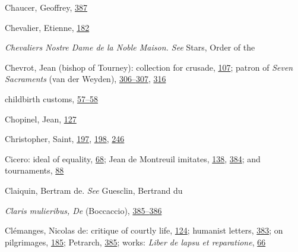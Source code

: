 Chaucer, Geoffrey,
\protect\hyperlink{22_Chapter_Fourteen__THE_COMING_OF.xhtmlux5cux23page_387}{387}

Chevalier, Etienne,
\protect\hyperlink{13_Chapter_Six__THE_DEPICTION_OF_TH.xhtmlux5cux23page_182}{182}

\emph{Chevaliers Nostre Dame de la Noble Maison. See} Stars, Order of
the

Chevrot, Jean (bishop of Tourney): collection for crusade,
\protect\hyperlink{10_Chapter_Three__THE_HEROIC_DREAM.xhtmlux5cux23page_107}{107};
patron of \emph{Seven Sacraments} (van der Weyden),
\protect\hyperlink{20_ILLUSTRATIONS_FOLLOW_PAGE.xhtmlux5cux23page_306}{306--}\protect\hyperlink{20_ILLUSTRATIONS_FOLLOW_PAGE.xhtmlux5cux23page_307}{307},
\protect\hyperlink{20_ILLUSTRATIONS_FOLLOW_PAGE.xhtmlux5cux23page_316}{316}

childbirth customs,
\protect\hyperlink{09_Chapter_Two__THE_CRAVING_FOR_A_M.xhtmlux5cux23page_57}{57--}\protect\hyperlink{09_Chapter_Two__THE_CRAVING_FOR_A_M.xhtmlux5cux23page_58}{58}

Chopinel, Jean,
\protect\hyperlink{11_Chapter_Four__THE_FORMS_OF_LOVE.xhtmlux5cux23page_127}{127}

Christopher, Saint,
\protect\hyperlink{13_Chapter_Six__THE_DEPICTION_OF_TH.xhtmlux5cux23page_197}{197},
\protect\hyperlink{13_Chapter_Six__THE_DEPICTION_OF_TH.xhtmlux5cux23page_198}{198},
\protect\hyperlink{16_Chapter_Nine__THE_DECLINE_OF_SYM.xhtmlux5cux23page_246}{246}

Cicero: ideal of equality,
\protect\hyperlink{10_Chapter_Three__THE_HEROIC_DREAM.xhtmlux5cux23page_68}{68};
Jean de Montreuil imitates,
\protect\hyperlink{11_Chapter_Four__THE_FORMS_OF_LOVE.xhtmlux5cux23page_138}{138},
\protect\hyperlink{22_Chapter_Fourteen__THE_COMING_OF.xhtmlux5cux23page_384}{384};
and tournaments,
\protect\hyperlink{10_Chapter_Three__THE_HEROIC_DREAM.xhtmlux5cux23page_88}{88}

\protect\hypertarget{25_INDEX.xhtmlux5cux23page_455}{}{}Claiquin,
Bertram de. \emph{See} Guesclin, Bertrand du

\emph{Claris mulieribus, De} (Boccaccio),
\protect\hyperlink{22_Chapter_Fourteen__THE_COMING_OF.xhtmlux5cux23page_385}{385--}\protect\hyperlink{22_Chapter_Fourteen__THE_COMING_OF.xhtmlux5cux23page_386}{386}

Clémanges, Nicolas de: critique of courtly life,
\protect\hyperlink{10_Chapter_Three__THE_HEROIC_DREAM.xhtmlux5cux23page_124}{124};
humanist letters,
\protect\hyperlink{22_Chapter_Fourteen__THE_COMING_OF.xhtmlux5cux23page_383}{383};
on pilgrimages,
\protect\hyperlink{13_Chapter_Six__THE_DEPICTION_OF_TH.xhtmlux5cux23page_185}{185};
Petrarch,
\protect\hyperlink{22_Chapter_Fourteen__THE_COMING_OF.xhtmlux5cux23page_385}{385};
works: \emph{Liber de lapsu et reparatione},
\protect\hyperlink{10_Chapter_Three__THE_HEROIC_DREAM.xhtmlux5cux23page_66}{66}

